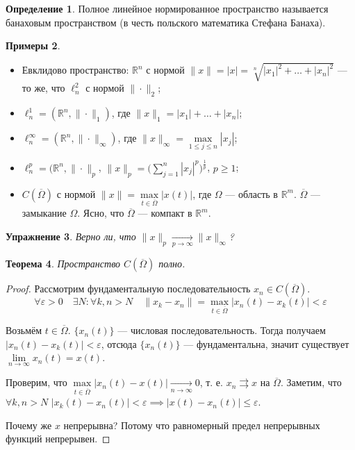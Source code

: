 \documentclass[11pt,openany,a4paper]{scrartcl}
\theoremstyle{plain}
\newtheorem{theorem}{Теорема}[section]
\newtheorem{exercise}[theorem]{Упражнение}
\theoremstyle{definition}
\newtheorem{definition}[theorem]{Определение}
\newtheorem{examples}[theorem]{Примеры}
\newcommand\mb{\mathbb}
\newcommand\real{\mb R}
\newcommand{\uto}{\rightrightarrows}
\newcommand{\underto}[1]{\xrightarrow[#1]{}}
\begin{document}
\begin{definition}
    Полное линейное нормированное пространство называется банаховым пространством (в честь
    польского математика Стефана Банаха).
\end{definition}
\begin{examples}
\mbox{}
    \begin{itemize}
        \item Евклидово пространство: $\real^n$ с нормой
        $\|x\| = |x| = \sqrt[n]{|x_1|^2 + \ldots + |x_n|^2}$ — то же, что
        $\ell_n^2$ с нормой $\|\cdot \|_2$;
        \item $\ell_n^1 = (\real^n, \|\cdot\|_1)$, где
        $\|x\|_1 = |x_1| + \ldots + |x_n|$;
        \item $\ell_n^\infty = (\real^n, \|\cdot\|_\infty)$,
        где $\|x\|_\infty = \max\limits_{1 \leqslant j \leqslant n} |x_j|$;
        \item $\ell_n^p = (\real^n, \|\cdot\|_p$,
        $\|x\|_p = \bigg(\sum\limits_{j=1}^n |x_j|^p\bigg)^{\frac{1}{p}}$,
        $p \geqslant 1$;
        \item $C(\overline \Omega)$ с нормой
        $\|x\| = \max\limits_{t \in \overline \Omega} |x(t)|$, где
        $\Omega$ — область в $\real^m$. $\overline\Omega$ — замыкание
        $\Omega$. Ясно, что $\overline \Omega$ — компакт в
        $\real^m$.
    \end{itemize}
\end{examples}
\begin{exercise}
    Верно ли, что $\|x\|_p \underto{p \to \infty} \|x\|_\infty$?
\end{exercise}

\begin{theorem}
    Пространство $C(\overline \Omega)$ полно.
\end{theorem}
\begin{proof}
    Рассмотрим фундаментальную последовательность $x_n \in C(\overline \Omega)$.
    $$
    \forall \varepsilon > 0\quad \exists N: \forall k, n > N\quad \|x_k - x_n\| =
    \max_{t \in \overline \Omega} |x_n(t) - x_k(t)| < \varepsilon
    $$

    Возьмём $t \in \overline \Omega$. $\{x_n(t)\}$ — числовая последовательность.
    Тогда получаем $|x_n(t) - x_k(t)| < \varepsilon$, отсюда $\{x_n(t)\}$ —
    фундаментальна, значит существует $\lim\limits_{n \to \infty} x_n(t) = x(t)$.

    Проверим, что $\max\limits_{t \in \overline \Omega} |x_n(t) - x(t)|
    \underto{n \to \infty} 0$, т. е. $x_n \uto x$ на $\overline \Omega$.
    Заметим, что $\forall k, n > N$ $|x_k(t) - x_n(t)| < \varepsilon \implies
    |x(t) - x_n(t)| \leqslant \varepsilon$.

    Почему же $x$ непрерывна? Потому что равномерный предел непрерывных функций
    непрерывен.

\end{proof}
\end{document}
